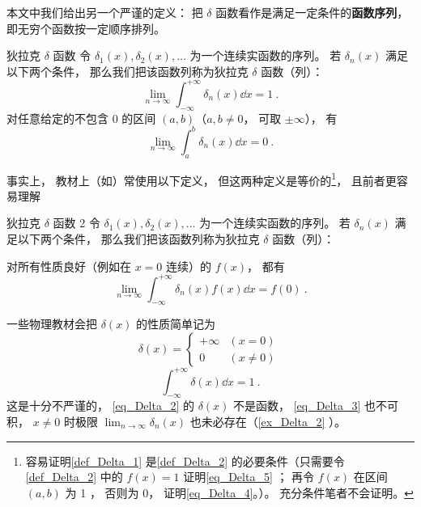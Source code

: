 本文中我们给出另一个严谨的定义： 把 $\delta$ 函数看作是满足一定条件的\textbf{函数序列}， 即无穷个函数按一定顺序排列。
\begin{definition}{狄拉克 $\delta$ 函数}\label{def_Delta_1}
令 $\delta_1(x), \delta_2(x), \dots$ 为一个连续实函数的序列。 若 $\delta_n(x)$ 满足以下两个条件， 那么我们把该函数列称为狄拉克 $\delta$ 函数（列）：
\begin{equation}\label{eq_Delta_5}
\lim_{n\to\infty}\int_{-\infty}^{+\infty} \delta_n(x) \dd{x} = 1~.
\end{equation}
对任意给定的不包含 0 的区间 $(a,b)$（$a,b \ne 0$， 可取 $\pm\infty$）， 有
\begin{equation}\label{eq_Delta_4}
\lim_{n\to\infty} \int_{a}^{b} \delta_n(x) \dd{x} = 0~.
\end{equation}
\end{definition}
事实上， 教材上（如\cite{Arfken}）常使用以下定义， 但这两种定义是等价的\footnote{容易证明\autoref{def_Delta_1} 是\autoref{def_Delta_2} 的必要条件（只需要令\autoref{def_Delta_2} 中的 $f(x) = 1$ 证明\autoref{eq_Delta_5} ； 再令 $f(x)$ 在区间 $(a,b)$ 为 1 ， 否则为 0， 证明\autoref{eq_Delta_4}。）。 充分条件笔者不会证明。}， 且前者更容易理解

\begin{definition}{狄拉克 $\delta$ 函数 2}\label{def_Delta_2}
令 $\delta_1(x), \delta_2(x), \dots$ 为一个连续实函数的序列。 若 $\delta_n(x)$ 满足以下两个条件， 那么我们把该函数列称为狄拉克 $\delta$ 函数（列）：

对所有性质良好（例如在 $x = 0$ 连续）的 $f(x)$， 都有
\begin{equation}
\lim_{n\to\infty}\int_{-\infty}^{+\infty} \delta_n(x)f(x) \dd{x} = f(0)~.
\end{equation}
\end{definition}

一些物理教材会把 $\delta(x)$ 的性质简单记为
\begin{equation}\label{eq_Delta_2}
\delta(x) =
\begin{cases}
+\infty & (x = 0)\\
0 & (x \ne 0)
\end{cases}~
\end{equation}
\begin{equation}\label{eq_Delta_3}
\int_{-\infty}^{+\infty} \delta(x) \dd{x} = 1~.
\end{equation}
这是十分不严谨的， \autoref{eq_Delta_2} 的 $\delta(x)$ 不是函数， \autoref{eq_Delta_3} 也不可积， $x \ne 0$ 时极限 $\lim_{n\to \infty}\delta_n(x)$ 也未必存在（\autoref{ex_Delta_2} ）。

